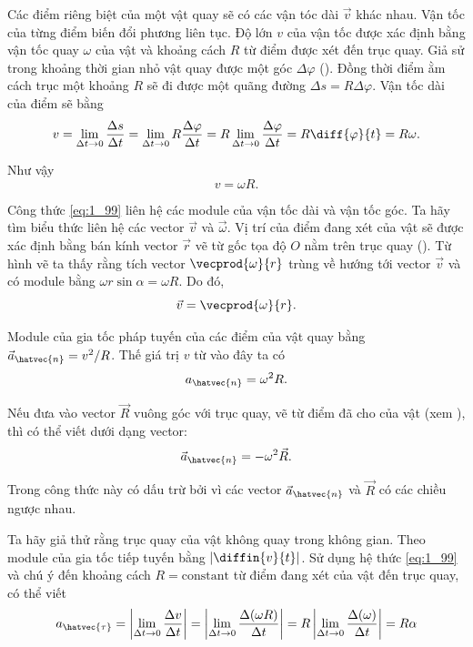 Các điểm riêng biệt của một vật quay sẽ có các vận tóc dài $\vec{v}$ khác nhau. Vận tốc của từng điểm biến đổi phương liên tục. Độ lớn $v$ của vận tốc được xác định bằng vận tốc quay $\omega$ của vật và khoảng cách $R$ từ điểm được xét đến trục quay. Giả sử trong khoảng thời gian nhỏ vật quay được một góc $\Delta\varphi$ (). Đồng thời điểm ằm cách trục một khoảng $R$ sẽ đi được một quãng đường $\Delta s=R\Delta\varphi$. Vận tốc dài của điểm sẽ bằng
\begin{equation*}
v = \lim_{\Delta t\to 0} \frac{\Delta s}{\Delta t} = \lim_{\Delta t\to 0} R\frac{\Delta\varphi}{\Delta t} = R \lim_{\Delta t\to 0} \frac{\Delta\varphi}{\Delta t} = R\diff{\varphi}{t} = R\omega.
\end{equation*}

\noindent
Như vậy
\begin{equation}\label{eq:1_99}
v = \omega R.
\end{equation}

Công thức \eqref{eq:1_99} liên hệ các module của vận tốc dài và vận tốc góc. Ta hãy tìm biểu thức liên hệ các vector $\vec{v}$ và $\vec{\omega}$. Vị trí của điểm đang xét của vật sẽ được xác định bằng bán kính vector $\vec{r}$ vẽ từ gốc tọa độ $O$ nằm trên trục quay (). Từ hình vẽ ta thấy rằng tích vector $\vecprod{\omega}{r}$ trùng về hướng tới vector $\vec{v}$ và có module bằng $\omega r\sin\alpha=\omega R$. Do đó,
\begin{equation}\label{eq:1_100}
\vec{v} = \vecprod{\omega}{r}.
\end{equation}

Module của gia tốc pháp tuyến của các điểm của vật quay bằng $\vec{a}_{\hatvec{n}}=v^2/R$. Thế giá trị $v$ từ  vào đây ta có
\begin{equation}\label{eq:1_101}
a_{\hatvec{n}} = \omega^2 R.
\end{equation}

\noindent
Nếu đưa vào vector $\vec{R}$ vuông góc với trục quay, vẽ từ điểm đã cho của vật (xem ), thì có thể viết  dưới dạng vector:
\begin{equation}\label{eq:1_102}
\vec{a}_{\hatvec{n}} = -\omega^2 \vec{R}.
\end{equation}

\noindent
Trong công thức này có dấu trừ bởi vì các vector $\vec{a}_{\hatvec{n}}$ và $\vec{R}$ có các chiều ngược nhau.

Ta hãy giả thử rằng trục quay của vật không quay trong không gian. Theo  module của gia tốc tiếp tuyến bằng $|\diffin{v}{t}|$. Sử dụng hệ thức \eqref{eq:1_99} và chú ý đến khoảng cách $R=\text{constant}$ từ điểm đang xét của vật đến trục quay, có thể viết
\begin{equation*}
a_{\hatvec{\tau}} = \left| \lim_{\Delta t\to 0} \frac{\Delta v}{\Delta t} \right| = \left| \lim_{\Delta t\to 0} \frac{\Delta(\omega R)}{\Delta t} \right| = R \left| \lim_{\Delta t\to 0} \frac{\Delta(\omega)}{\Delta t} \right| = R\alpha
\end{equation*}

